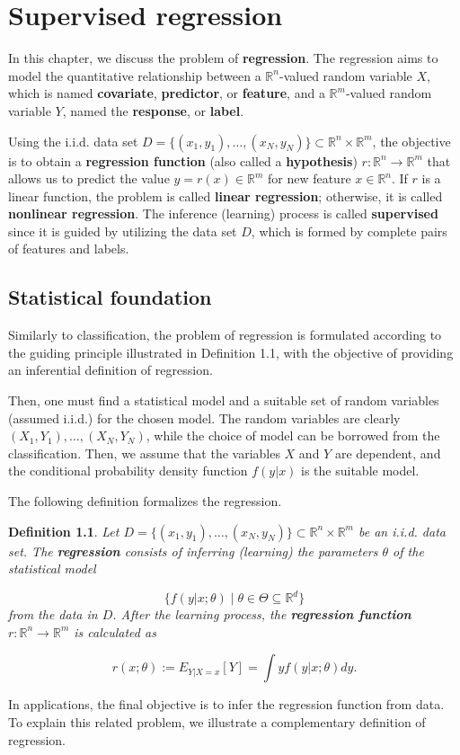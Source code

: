 \documentclass{report}
\newtheorem{definition}{Definition}[chapter]
\begin{document}
\chapter{Supervised regression}
In this chapter, we discuss the problem of \textbf{regression}. The regression aims to model the quantitative relationship between a $\mathbb{R}^n$-valued random variable $X$, which is named \textbf{covariate}, \textbf{predictor}, or \textbf{feature}, and a $\mathbb{R}^m$-valued random variable $Y$, named the \textbf{response}, or \textbf{label}.

Using the i.i.d. data set $D = \{(x_1,y_1),\dots,(x_N,y_N)\} \subset \mathbb{R}^n \times \mathbb{R}^m$, the objective is to obtain a \textbf{regression function} (also called a \textbf{hypothesis}) $r : \mathbb{R}^n \to \mathbb{R}^m$ that allows us to predict the value $y = r(x) \in \mathbb{R}^m$ for new feature $x \in \mathbb{R}^n$. If $r$ is a linear function, the problem is called \textbf{linear regression}; otherwise, it is called \textbf{nonlinear regression}. The inference (learning) process is called \textbf{supervised} since it is guided by utilizing the data set $D$, which is formed by complete pairs of features and labels.

\section{Statistical foundation}
Similarly to classification, the problem of regression is formulated according to the guiding principle illustrated in Definition 1.1, with the objective of providing an inferential definition of regression.

Then, one must find a statistical model and a suitable set of random variables (assumed i.i.d.) for the chosen model. The random variables are clearly $(X_1,Y_1),\dots,(X_N,Y_N)$, while the choice of model can be borrowed from the classification. Then, we assume that the variables $X$ and $Y$ are dependent, and the conditional probability density function $f(y|x)$ is the suitable model.

The following definition formalizes the regression.

\begin{definition}
Let $D = \{(x_1,y_1),\dots,(x_N,y_N)\} \subset \mathbb{R}^n \times \mathbb{R}^m$ be an i.i.d. data set. The \textbf{regression} consists of inferring (learning) the parameters $\theta$ of the statistical model

\begin{equation}
\{f(y|x;\theta) \mid \theta \in \Theta \subseteq \mathbb{R}^d\}
\end{equation}
from the data in $D$. After the learning process, the \textbf{regression function} $r : \mathbb{R}^n \to \mathbb{R}^m$ is calculated as

\begin{equation}
r(x;\theta) := E_{Y|X = x}[Y] = \int yf(y|x;\theta)dy.
\end{equation}
\end{definition}
In applications, the final objective is to infer the regression function from data. To explain this related problem, we illustrate a complementary definition of regression.
\end{document}
